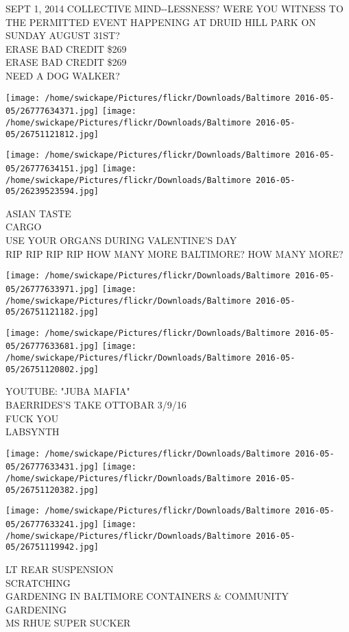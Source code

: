\documentclass[10pt,letterpaper]{article}
\begin{document}
SEPT 1, 2014 COLLECTIVE MIND{-}{-}LESSNESS?  WERE YOU WITNESS TO THE PERMITTED EVENT HAPPENING AT DRUID HILL PARK ON SUNDAY AUGUST 31ST?\\
ERASE BAD CREDIT \$269\\
ERASE BAD CREDIT \$269\\
NEED A DOG WALKER?
\pagebreak

\texttt{[image: /home/swickape/Pictures/flickr/Downloads/Baltimore 2016-05-05/26777634371.jpg]}
\texttt{[image: /home/swickape/Pictures/flickr/Downloads/Baltimore 2016-05-05/26751121812.jpg]}

\texttt{[image: /home/swickape/Pictures/flickr/Downloads/Baltimore 2016-05-05/26777634151.jpg]}
\texttt{[image: /home/swickape/Pictures/flickr/Downloads/Baltimore 2016-05-05/26239523594.jpg]}

ASIAN TASTE\\
CARGO\\
USE YOUR ORGANS DURING VALENTINE'S DAY\\
RIP RIP RIP RIP HOW MANY MORE BALTIMORE?  HOW MANY MORE?
\pagebreak

\texttt{[image: /home/swickape/Pictures/flickr/Downloads/Baltimore 2016-05-05/26777633971.jpg]}
\texttt{[image: /home/swickape/Pictures/flickr/Downloads/Baltimore 2016-05-05/26751121182.jpg]}

\texttt{[image: /home/swickape/Pictures/flickr/Downloads/Baltimore 2016-05-05/26777633681.jpg]}
\texttt{[image: /home/swickape/Pictures/flickr/Downloads/Baltimore 2016-05-05/26751120802.jpg]}

YOUTUBE: "JUBA MAFIA"\\
BAERRIDES'S TAKE OTTOBAR 3/9/16\\
FUCK YOU\\
LABSYNTH
\pagebreak

\texttt{[image: /home/swickape/Pictures/flickr/Downloads/Baltimore 2016-05-05/26777633431.jpg]}
\texttt{[image: /home/swickape/Pictures/flickr/Downloads/Baltimore 2016-05-05/26751120382.jpg]}

\texttt{[image: /home/swickape/Pictures/flickr/Downloads/Baltimore 2016-05-05/26777633241.jpg]}
\texttt{[image: /home/swickape/Pictures/flickr/Downloads/Baltimore 2016-05-05/26751119942.jpg]}

LT REAR SUSPENSION\\
SCRATCHING\\
GARDENING IN BALTIMORE CONTAINERS \& COMMUNITY GARDENING\\
MS RHUE SUPER SUCKER
\pagebreak
\end{document}
